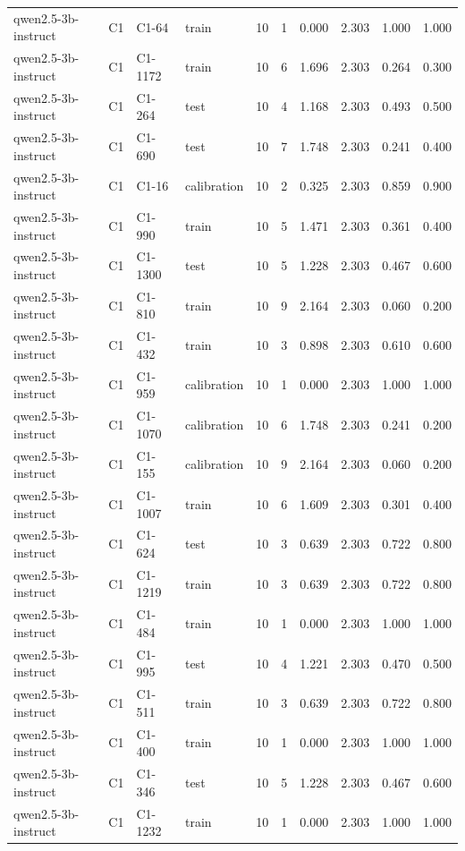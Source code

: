 \begin{table}
\begin{tabular}{llllrrrrrr}
qwen2.5-3b-instruct & C1 & C1-64 & train & 10 & 1 & 0.000 & 2.303 & 1.000 & 1.000 \\
qwen2.5-3b-instruct & C1 & C1-1172 & train & 10 & 6 & 1.696 & 2.303 & 0.264 & 0.300 \\
qwen2.5-3b-instruct & C1 & C1-264 & test & 10 & 4 & 1.168 & 2.303 & 0.493 & 0.500 \\
qwen2.5-3b-instruct & C1 & C1-690 & test & 10 & 7 & 1.748 & 2.303 & 0.241 & 0.400 \\
qwen2.5-3b-instruct & C1 & C1-16 & calibration & 10 & 2 & 0.325 & 2.303 & 0.859 & 0.900 \\
qwen2.5-3b-instruct & C1 & C1-990 & train & 10 & 5 & 1.471 & 2.303 & 0.361 & 0.400 \\
qwen2.5-3b-instruct & C1 & C1-1300 & test & 10 & 5 & 1.228 & 2.303 & 0.467 & 0.600 \\
qwen2.5-3b-instruct & C1 & C1-810 & train & 10 & 9 & 2.164 & 2.303 & 0.060 & 0.200 \\
qwen2.5-3b-instruct & C1 & C1-432 & train & 10 & 3 & 0.898 & 2.303 & 0.610 & 0.600 \\
qwen2.5-3b-instruct & C1 & C1-959 & calibration & 10 & 1 & 0.000 & 2.303 & 1.000 & 1.000 \\
qwen2.5-3b-instruct & C1 & C1-1070 & calibration & 10 & 6 & 1.748 & 2.303 & 0.241 & 0.200 \\
qwen2.5-3b-instruct & C1 & C1-155 & calibration & 10 & 9 & 2.164 & 2.303 & 0.060 & 0.200 \\
qwen2.5-3b-instruct & C1 & C1-1007 & train & 10 & 6 & 1.609 & 2.303 & 0.301 & 0.400 \\
qwen2.5-3b-instruct & C1 & C1-624 & test & 10 & 3 & 0.639 & 2.303 & 0.722 & 0.800 \\
qwen2.5-3b-instruct & C1 & C1-1219 & train & 10 & 3 & 0.639 & 2.303 & 0.722 & 0.800 \\
qwen2.5-3b-instruct & C1 & C1-484 & train & 10 & 1 & 0.000 & 2.303 & 1.000 & 1.000 \\
qwen2.5-3b-instruct & C1 & C1-995 & test & 10 & 4 & 1.221 & 2.303 & 0.470 & 0.500 \\
qwen2.5-3b-instruct & C1 & C1-511 & train & 10 & 3 & 0.639 & 2.303 & 0.722 & 0.800 \\
qwen2.5-3b-instruct & C1 & C1-400 & train & 10 & 1 & 0.000 & 2.303 & 1.000 & 1.000 \\
qwen2.5-3b-instruct & C1 & C1-346 & test & 10 & 5 & 1.228 & 2.303 & 0.467 & 0.600 \\
qwen2.5-3b-instruct & C1 & C1-1232 & train & 10 & 1 & 0.000 & 2.303 & 1.000 & 1.000 \\

\end{tabular}
\end{table}
